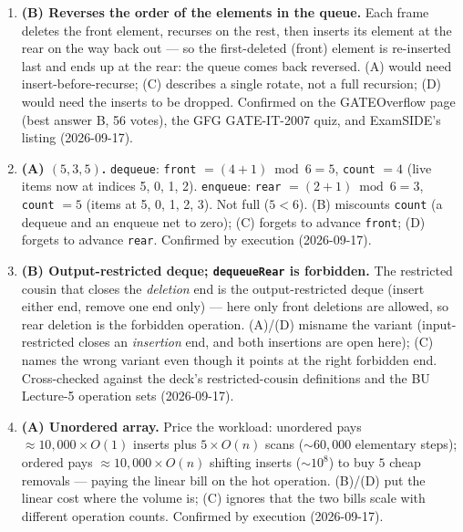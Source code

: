\documentclass[11pt]{article}
\begin{document}
\begin{enumerate}
\item[\textbf{Q5}] \textbf{(B) Reverses the order of the elements in the queue.} Each frame deletes the front element, recurses on the rest, then inserts its element at the rear on the way back out --- so the first-deleted (front) element is re-inserted last and ends up at the rear: the queue comes back reversed. (A) would need insert-before-recurse; (C) describes a single rotate, not a full recursion; (D) would need the inserts to be dropped. Confirmed on the GATEOverflow page (best answer B, 56 votes), the GFG GATE-IT-2007 quiz, and ExamSIDE's listing (2026-09-17).

\item[\textbf{Q6}] \textbf{(A) $(5, 3, 5)$.} \texttt{dequeue}: \texttt{front} $= (4+1) \bmod 6 = 5$, \texttt{count} $= 4$ (live items now at indices 5, 0, 1, 2). \texttt{enqueue}: \texttt{rear} $= (2+1) \bmod 6 = 3$, \texttt{count} $= 5$ (items at 5, 0, 1, 2, 3). Not full ($5 < 6$). (B) miscounts \texttt{count} (a dequeue and an enqueue net to zero); (C) forgets to advance \texttt{front}; (D) forgets to advance \texttt{rear}. Confirmed by execution (2026-09-17).

\item[\textbf{Q7}] \textbf{(B) Output-restricted deque; \texttt{dequeueRear} is forbidden.} The restricted cousin that closes the \emph{deletion} end is the output-restricted deque (insert either end, remove one end only) --- here only front deletions are allowed, so rear deletion is the forbidden operation. (A)/(D) misname the variant (input-restricted closes an \emph{insertion} end, and both insertions are open here); (C) names the wrong variant even though it points at the right forbidden end. Cross-checked against the deck's restricted-cousin definitions and the BU Lecture-5 operation sets (2026-09-17).

\item[\textbf{Q8}] \textbf{(A) Unordered array.} Price the workload: unordered pays $\approx 10{,}000 \times O(1)$ inserts plus $5 \times O(n)$ scans ($\sim 60{,}000$ elementary steps); ordered pays $\approx 10{,}000 \times O(n)$ shifting inserts ($\sim 10^8$) to buy $5$ cheap removals --- paying the linear bill on the hot operation. (B)/(D) put the linear cost where the volume is; (C) ignores that the two bills scale with different operation counts. Confirmed by execution (2026-09-17).
\end{enumerate}
\end{document}
